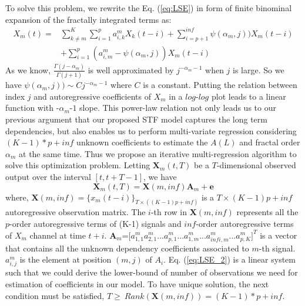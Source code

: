 To solve this problem, we rewrite the Eq. (\ref{eq:LSE}) in form of finite binominal expansion of the fractally integrated terms as:
\vspace {-4mm}
\begin{eqnarray}
X_{m}(t)=& \sum_{k\neq m}^{K}\sum_{i=1}^{p}a_{i,k}^{m}X_{k}(t-i)+\sum_{i=p+1}^{inf}\psi(\alpha_{m},j))X_m(t-i)\nonumber \\
&+\sum_{i=1}^{p}(a_{i,m}^{m}-\psi(\alpha_{m},j))X_m(t-i)\label{eq:bino_expan}
\end{eqnarray}
\vskip -2mm
As we know,  $\frac{\Gamma(j-\alpha_{m})}{\Gamma(j+1)}$ is well approximated by $j^{-\alpha_{m}-1}$ when $j$ is large. So we have $\psi(\alpha_{m},j))\sim Cj^{-\alpha_{m}-1}$ where $C$ is a constant. Putting the relation between index $j$ and autoregressive coefficients of $X_m$ in a $log$-$log$ plot leads to a linear function with -$\alpha_{m}$-$1$ slope. This power-law relation not only leads us to our previous argument that our proposed STF model captures the long term dependencies, but also enables us to perform multi-variate regression considering $(K-1)*p+inf$ unknown coefficients to estimate the $A(L)$ and fractal order $\alpha_{m}$ at the same time. Thus we propose an iterative multi-regression algorithm to solve this optimization problem. Letting $\textbf{X}_{m}(t,T)$ be a $T$-dimensional observed output over the interval $[t,t+T-1]$, we have
\vspace {-2mm}
\begin{equation}\label{eq:LSE_2}
\textbf{X}_m(t,T)=\textbf{X}(m,inf) \textbf{A}_{m}+\textbf{e}
\end{equation}
\vskip -2mm
where, $\textbf{X}(m,inf)=\{x_{m}(t-i)\}_{T\times ((K-1)p+inf)}$ is a $T\times (K-1)p+inf$ autoregressive observation matrix. The $i$-th row in \textbf{X}$(m,inf)$ represents all the $p$-order autoregressive terms of (K-1) signals  and $inf$-order autoregressive terms of $X_m$ channel at time $t+i$. $\textbf{A}_{m}$=$[a^{m}_{1,1}a^{m}_{2,1}$...$a^{m}_{p,1}$...$a^{m}_{1,m}$...$a^{m}_{infi,m}$...$a^{m}_{p,K}]^T$ is a vector that contains all the unknown dependency coefficients associated to $m$-th signal. $a^{m}_{i,j}$ is the element at position $ (m,j)$ of $A_i$. Eq.  (\ref{eq:LSE_2}) is a linear system such that we could derive the lower-bound of number of observations we need for estimation of coefficients in our model. To have unique solution, the next condition must be satisfied, $T \geq \ Rank(\textbf{X}(m,inf))=(K-1)*p+inf$.  
